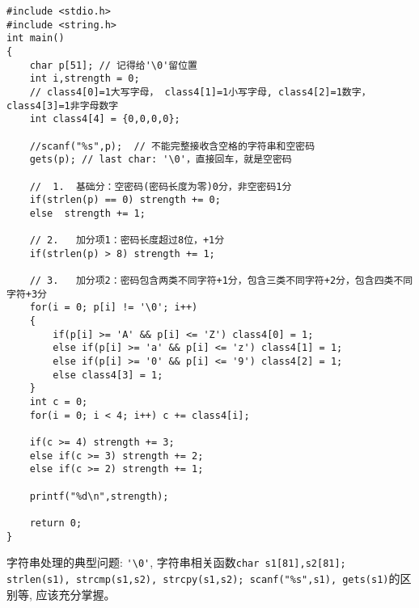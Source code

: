 \begin{lstlisting}	
#include <stdio.h>
#include <string.h>
int main()
{
	char p[51]; // 记得给'\0'留位置
	int i,strength = 0;
	// class4[0]=1大写字母， class4[1]=1小写字母, class4[2]=1数字， class4[3]=1非字母数字 
	int class4[4] = {0,0,0,0};  
	
	//scanf("%s",p);  // 不能完整接收含空格的字符串和空密码 
	gets(p); // last char: '\0'，直接回车，就是空密码 
	
	// 	1.	基础分：空密码(密码长度为零)0分，非空密码1分 
	if(strlen(p) == 0) strength += 0;
	else  strength += 1;
	
	// 2.	加分项1：密码长度超过8位，+1分 
	if(strlen(p) > 8) strength += 1;
	
	// 3.	加分项2：密码包含两类不同字符+1分，包含三类不同字符+2分，包含四类不同字符+3分 
	for(i = 0; p[i] != '\0'; i++)
	{
		if(p[i] >= 'A' && p[i] <= 'Z') class4[0] = 1; 
		else if(p[i] >= 'a' && p[i] <= 'z') class4[1] = 1; 
		else if(p[i] >= '0' && p[i] <= '9') class4[2] = 1;
		else class4[3] = 1; 
	}
	int c = 0;
	for(i = 0; i < 4; i++) c += class4[i];
	
	if(c >= 4) strength += 3;
	else if(c >= 3) strength += 2;
	else if(c >= 2) strength += 1;
	
	printf("%d\n",strength);
	
	return 0;
}
\end{lstlisting}

\begin{note}[要点]
	字符串处理的典型问题: \lstinline|'\0'|, 字符串相关函数\lstinline|char s1[81],s2[81]; strlen(s1), strcmp(s1,s2), strcpy(s1,s2); scanf("%s",s1), gets(s1)|的区别等, 应该充分掌握。
\end{note}

